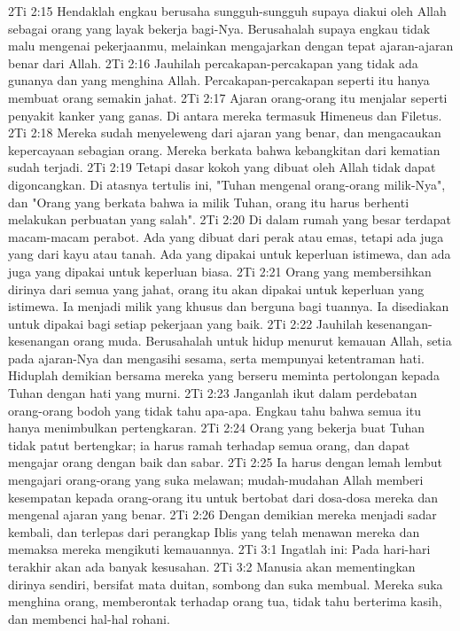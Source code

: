 2Ti 2:15  Hendaklah engkau berusaha sungguh-sungguh supaya diakui oleh Allah sebagai orang yang layak bekerja bagi-Nya. Berusahalah supaya engkau tidak malu mengenai pekerjaanmu, melainkan mengajarkan dengan tepat ajaran-ajaran benar dari Allah.
2Ti 2:16  Jauhilah percakapan-percakapan yang tidak ada gunanya dan yang menghina Allah. Percakapan-percakapan seperti itu hanya membuat orang semakin jahat.
2Ti 2:17  Ajaran orang-orang itu menjalar seperti penyakit kanker yang ganas. Di antara mereka termasuk Himeneus dan Filetus.
2Ti 2:18  Mereka sudah menyeleweng dari ajaran yang benar, dan mengacaukan kepercayaan sebagian orang. Mereka berkata bahwa kebangkitan dari kematian sudah terjadi.
2Ti 2:19  Tetapi dasar kokoh yang dibuat oleh Allah tidak dapat digoncangkan. Di atasnya tertulis ini, "Tuhan mengenal orang-orang milik-Nya", dan "Orang yang berkata bahwa ia milik Tuhan, orang itu harus berhenti melakukan perbuatan yang salah".
2Ti 2:20  Di dalam rumah yang besar terdapat macam-macam perabot. Ada yang dibuat dari perak atau emas, tetapi ada juga yang dari kayu atau tanah. Ada yang dipakai untuk keperluan istimewa, dan ada juga yang dipakai untuk keperluan biasa.
2Ti 2:21  Orang yang membersihkan dirinya dari semua yang jahat, orang itu akan dipakai untuk keperluan yang istimewa. Ia menjadi milik yang khusus dan berguna bagi tuannya. Ia disediakan untuk dipakai bagi setiap pekerjaan yang baik.
2Ti 2:22  Jauhilah kesenangan-kesenangan orang muda. Berusahalah untuk hidup menurut kemauan Allah, setia pada ajaran-Nya dan mengasihi sesama, serta mempunyai ketentraman hati. Hiduplah demikian bersama mereka yang berseru meminta pertolongan kepada Tuhan dengan hati yang murni.
2Ti 2:23  Janganlah ikut dalam perdebatan orang-orang bodoh yang tidak tahu apa-apa. Engkau tahu bahwa semua itu hanya menimbulkan pertengkaran.
2Ti 2:24  Orang yang bekerja buat Tuhan tidak patut bertengkar; ia harus ramah terhadap semua orang, dan dapat mengajar orang dengan baik dan sabar.
2Ti 2:25  Ia harus dengan lemah lembut mengajari orang-orang yang suka melawan; mudah-mudahan Allah memberi kesempatan kepada orang-orang itu untuk bertobat dari dosa-dosa mereka dan mengenal ajaran yang benar.
2Ti 2:26  Dengan demikian mereka menjadi sadar kembali, dan terlepas dari perangkap Iblis yang telah menawan mereka dan memaksa mereka mengikuti kemauannya.
2Ti 3:1  Ingatlah ini: Pada hari-hari terakhir akan ada banyak kesusahan.
2Ti 3:2  Manusia akan mementingkan dirinya sendiri, bersifat mata duitan, sombong dan suka membual. Mereka suka menghina orang, memberontak terhadap orang tua, tidak tahu berterima kasih, dan membenci hal-hal rohani.
